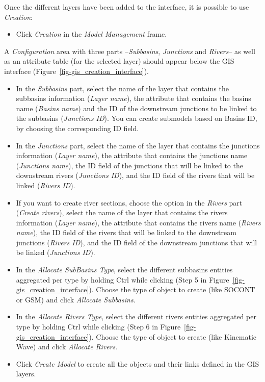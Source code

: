 \documentclass[
  letterpaper,
  DIV=11,
  numbers=noendperiod]{scrreprt}
\providecommand{\tightlist}{%
  \setlength{\itemsep}{0pt}\setlength{\parskip}{0pt}}\usepackage{longtable,booktabs,array}
\begin{document}
Once the different layers have been added to the interface, it is
possible to use \emph{Creation}:

\begin{itemize}
\tightlist
\item
  {Click \emph{Creation} in the \emph{Model Management} frame.}
\end{itemize}

A \emph{Configuration} area with three parts --\emph{Subbasins},
\emph{Junctions} and \emph{Rivers}-- as well as an attribute table (for
the selected layer) should appear below the GIS interface
(Figure~\ref{fig-gis_creation_interface}).

\begin{itemize}
\item
  {In the \emph{Subbasins} part, select the name of the layer that
  contains the subbasins information (\emph{Layer name}), the attribute
  that contains the basins name (\emph{Basins name}) and the ID of the
  downstream junctions to be linked to the subbasins (\emph{Junctions
  ID}). You can create submodels based on Basins ID, by choosing the
  corresponding ID field.}
\item
  {In the \emph{Junctions} part, select the name of the layer that
  contains the junctions information (\emph{Layer name}), the attribute
  that contains the junctions name (\emph{Junctions name}), the ID field
  of the junctions that will be linked to the downstream rivers
  (\emph{Junctions ID}), and the ID field of the rivers that will be
  linked (\emph{Rivers ID}).}
\item
  {If you want to create river sections, choose the option in the
  \emph{Rivers} part (\emph{Create rivers}), select the name of the
  layer that contains the rivers information (\emph{Layer name}), the
  attribute that contains the rivers name (\emph{Rivers name}), the ID
  field of the rivers that will be linked to the downstream junctions
  (\emph{Rivers ID}), and the ID field of the downstream junctions that
  will be linked (\emph{Junctions ID}).}
\item
  {In the \emph{Allocate SubBasins Type}, select the different subbasins
  entities aggregated per type by holding Ctrl while clicking (Step 5 in
  Figure~\ref{fig-gis_creation_interface}). Choose the type of object to
  create (like SOCONT or GSM) and click \emph{Allocate Subbasins}.}
\item
  {In the \emph{Allocate Rivers Type}, select the different rivers
  entities aggregated per type by holding Ctrl while clicking (Step 6 in
  Figure~\ref{fig-gis_creation_interface}). Choose the type of object to
  create (like Kinematic Wave) and click \emph{Allocate Rivers}.}
\item
  {Click \emph{Create Model} to create all the objects and their links
  defined in the GIS layers.}
\end{itemize}
\end{document}
